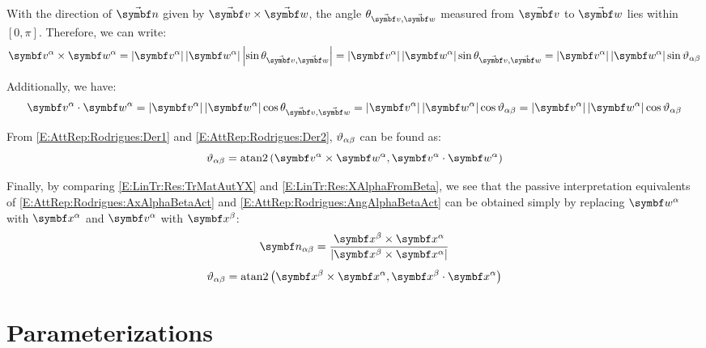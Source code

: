 With the direction of $\vabs{\rotax}$ given by $\vabs{v}\times \vabs{w}$, the angle $\theta_{\vabs{v},\vabs{w}}$ measured from $\vabs{v}$ to $\vabs{w}$ lies within $[0, \pi]$. Therefore, we can write:
\begin{gather} \label{E:AttRep:Rodrigues:Der1}
	\vprj{v}{\alpha} \times \vprj{w}{\alpha} = \norm{\vprj{v}{\alpha}} \norm{\vprj{w}{\alpha}} \abs{\sin \theta_{\vabs{v},\vabs{w}}} = \norm{\vprj{v}{\alpha}} \norm{\vprj{w}{\alpha}} \sin \theta_{\vabs{v},\vabs{w}} = \norm{\vprj{v}{\alpha}} \norm{\vprj{w}{\alpha}} \sin \rel{\rotang}{\alpha}{\beta}
\end{gather}

Additionally, we have:
\begin{equation} \label{E:AttRep:Rodrigues:Der2}
	\vprj{v}{\alpha} \cdot \vprj{w}{\alpha} = \norm{\vprj{v}{\alpha}} \norm{\vprj{w}{\alpha}} \cos \theta_{\vabs{v},\vabs{w}} = \norm{\vprj{v}{\alpha}} \norm{\vprj{w}{\alpha}} \cos \rel{\rotang}{\alpha}{\beta} = \norm{\vprj{v}{\alpha}} \norm{\vprj{w}{\alpha}} \cos \rel{\rotang}{\alpha}{\beta}
\end{equation}

From \eqref{E:AttRep:Rodrigues:Der1} and \eqref{E:AttRep:Rodrigues:Der2}, $\vartheta_{\alpha \beta}$ can be found as:
\begin{equation} \label{E:AttRep:Rodrigues:AngAlphaBetaAct}
	\rel{\rotang}{\alpha}{\beta} = \atan2 \left( \vprj{v}{\alpha} \times \vprj{w}{\alpha}, \vprj{v}{\alpha} \cdot \vprj{w}{\alpha} \right)
\end{equation}

Finally, by comparing \eqref{E:LinTr:Res:TrMatAutYX} and \eqref{E:LinTr:Res:XAlphaFromBeta}, we see that the passive interpretation equivalents of \eqref{E:AttRep:Rodrigues:AxAlphaBetaAct} and \eqref{E:AttRep:Rodrigues:AngAlphaBetaAct} can be obtained simply by replacing $\vprj{w}{\alpha}$ with $\vprj{x}{\alpha}$ and $\vprj{v}{\alpha}$ with $\vprj{x}{\beta}$:
\begin{gather}
	\vrel{\rotax}{\alpha}{\beta} = \frac{\vprj{x}{\beta} \times \vprj{x}{\alpha}}{\norm{\vprj{x}{\beta} \times \vprj{x}{\alpha}}}\\[1ex]
	\rel{\rotang}{\alpha}{\beta} = \atan2 \left( \vprj{x}{\beta} \times \vprj{x}{\alpha}, \vprj{x}{\beta} \cdot \vprj{x}{\alpha} \right)
\end{gather}

\section{Parameterizations}
